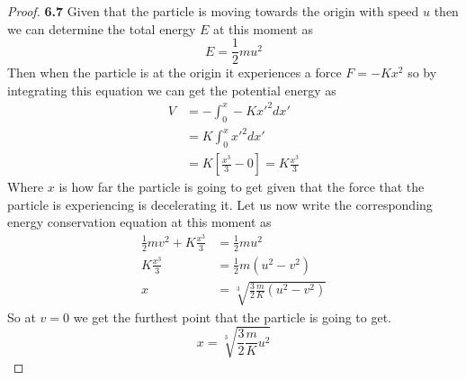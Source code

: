 \documentclass[11pt]{article}
\theoremstyle{definition}
\begin{document}
    \begin{proof}{\textbf{6.7}}
        Given that the particle is moving towards the origin with speed $u$ then we can
        determine the total energy $E$ at this moment as
        $$E = \frac{1}{2}mu^2$$
        Then when the particle is at the origin it experiences a force $F = -Kx^2$ so
        by integrating this equation we can get the potential energy as
        \begin{align*}
            V &= -\int_0^x -K{x'}^2 dx'\\
              &= K\int_0^x {x'}^2 dx'\\
              &= K\left[\frac{x^3}{3} -0\right] = K\frac{x^3}{3}
        \end{align*}
        Where $x$ is how far the particle is going to get given that the force that the
        particle is experiencing is decelerating it.
        Let us now write the corresponding energy conservation equation at this moment
        as
        \begin{align*}
            \frac{1}{2}mv^2 + K\frac{x^3}{3} &= \frac{1}{2}mu^2\\
            K\frac{x^3}{3} &= \frac{1}{2}m(u^2-v^2)\\
            x &= \sqrt[3]{\frac{3}{2}\frac{m}{K}(u^2-v^2)}
        \end{align*} 
        So at $v=0$ we get the furthest point that the particle is going to get.
        $$x = \sqrt[3]{\frac{3}{2}\frac{m}{K}u^2}$$ 
    \end{proof}
\cleardoublepage
\end{document}
